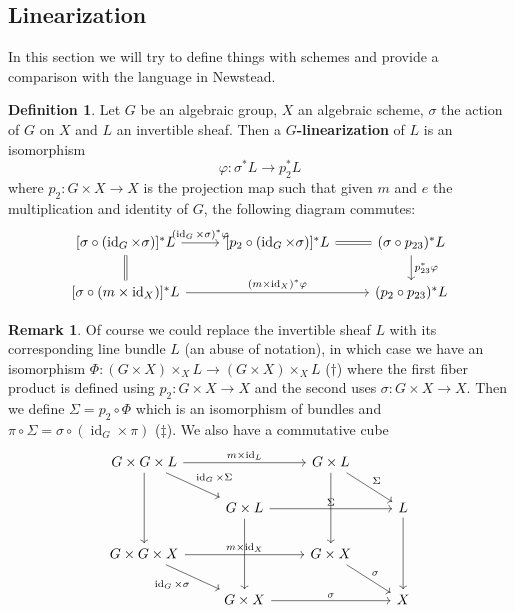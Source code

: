 \documentclass[12pt]{article}
\theoremstyle{remark}
\theoremstyle{definition}
\newtheorem{remark}{Remark}[section]
\newtheorem{definition}{Definition}[section]
\newcommand{\s}[0]{\sigma}
\newcommand{\id}[0]{\operatorname{id}}
\begin{document}
    \subsection{Linearization}
    In this section we will try to define things with schemes and provide a comparison with the language in Newstead.
    \begin{definition}
        Let $G$ be an algebraic group, $X$ an algebraic scheme, $\s$ the action of $G$ on $X$ and $L$ an invertible sheaf. Then a \textbf{$G$-linearization} of $L$ is an isomorphism
        \[\varphi:\s^*L\to p_2^*L\]
        where $p_2:G\times X\to X$ is the projection map such that given $m$ and $e$ the multiplication and identity of $G$, the following diagram commutes:
        \[
        \begin{tikzcd}
                {[\sigma\circ(\id_G\times\sigma)]^*L} \arrow[r, "(\id_G\times\sigma)^*\varphi"] \arrow[d,Rightarrow, no head] & {[p_2\circ(\id_G\times\sigma)]^*L} \arrow[r, Rightarrow, no head] & (\sigma\circ p_{23})^*L \arrow[d, "p_{23}^*\varphi"] \\
                {[\s\circ(m\times \id_X)]^*L} \arrow[rr, "(m\times\id_X)^*\varphi"]                                            &                                                                   & (p_2\circ p_{23})^*L                                
        \end{tikzcd}
        \]
    \end{definition}
    \begin{remark}
        Of course we could replace the invertible sheaf $L$ with its corresponding line bundle $L$ (an abuse of notation), in which case we have an isomorphism $\Phi:(G\times X)\times_X  L\to (G\times X)\times_X L$ ($\dagger$) where the first fiber product is defined using $p_2:G\times X\to X$ and the second uses $\s:G\times X\to X$. Then we define $\Sigma=p_2\circ\Phi$ which is an isomorphism of bundles and $\pi\circ\Sigma=\s\circ(\id_G\times\pi)$ ($\ddagger$). We also have a commutative cube
        \[
            \begin{tikzcd}
                G\times G\times L \arrow[rd, "\id_G\times\Sigma"] \arrow[dd] \arrow[rr, "m\times\id_L"] &                                           & G\times L \arrow[rd, "\Sigma"] \arrow[dd] &              \\
                                                                                                        & G\times L \arrow[rr, "\Sigma"] \arrow[dd] &                                           & L \arrow[dd] \\
                G\times G\times X \arrow[rd, "\id_G\times\s"'] \arrow[rr, "m\times\id_X"]               &                                           & G\times X \arrow[rd, "\s"]                &              \\
                                                                                                        & G\times X \arrow[rr, "\s"]                &                                           & X           
                \end{tikzcd}
        \]
    \end{remark}
\end{document}
